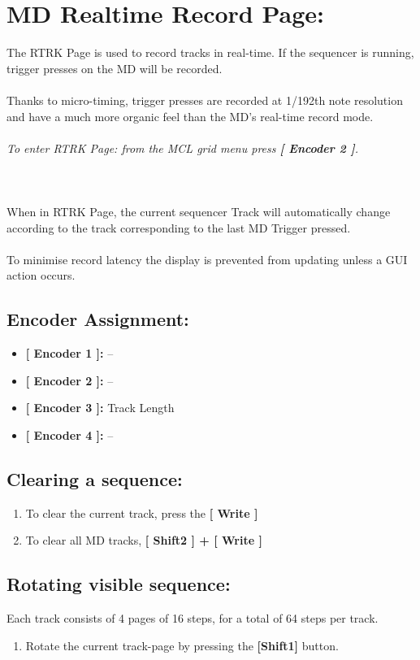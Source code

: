 \chapter{MD Realtime Record Page:}

The RTRK Page is used to record tracks in real-time. If the sequencer is running, trigger presses on the MD will be recorded.\\
\\
Thanks to micro-timing, trigger presses are recorded at 1/192th note resolution and have a much more organic feel than the MD’s real-time record mode.\\\\
\textit{To enter RTRK Page: from the MCL grid menu press \textbf{[ Encoder 2 ]}.}\\
\\
\\
\\
When in RTRK Page, the current sequencer Track will automatically change according to the track corresponding to the last MD Trigger pressed.\\
\\To minimise record latency the display is prevented from updating unless a GUI action occurs. 
\section{Encoder Assignment:}
\begin{itemize}
	\item \textbf{[ Encoder 1 ]: } --
	\item \textbf{[ Encoder 2 ]: } --
	\item \textbf{[ Encoder 3 ]: } Track Length
	\item \textbf{[ Encoder 4 ]: } --
\end{itemize}
\section{Clearing a sequence:}
\begin{enumerate}
	\item To clear the current track, press the\textbf{ [ Write ]}
	\item To clear all MD tracks,  \textbf{[ Shift2 ] + [ Write ]}
\end{enumerate}
\section{Rotating visible sequence:}
Each track consists of 4 pages of 16 steps, for a total of 64 steps per track.
\begin{enumerate}
	\item Rotate the current track-page by pressing the \textbf{[Shift1] }button.
\end{enumerate}
